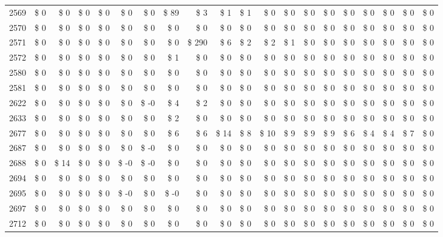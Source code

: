 \begin{longtable}{lrrrrrrrrrrrrrrrrrrr}
2569 & \$ 0 & \$ 0 & \$ 0 & \$ 0 & \$ 0 & \$ 0 & \$ 89 & \$ 3 & \$ 1 & \$ 1 & \$ 0 & \$ 0 & \$ 0 & \$ 0 & \$ 0 & \$ 0 & \$ 0 & \$ 0 & \$ 0 \\
2570 & \$ 0 & \$ 0 & \$ 0 & \$ 0 & \$ 0 & \$ 0 & \$ 0 & \$ 0 & \$ 0 & \$ 0 & \$ 0 & \$ 0 & \$ 0 & \$ 0 & \$ 0 & \$ 0 & \$ 0 & \$ 0 & \$ 0 \\
2571 & \$ 0 & \$ 0 & \$ 0 & \$ 0 & \$ 0 & \$ 0 & \$ 0 & \$ 290 & \$ 6 & \$ 2 & \$ 2 & \$ 1 & \$ 0 & \$ 0 & \$ 0 & \$ 0 & \$ 0 & \$ 0 & \$ 0 \\
2572 & \$ 0 & \$ 0 & \$ 0 & \$ 0 & \$ 0 & \$ 0 & \$ 1 & \$ 0 & \$ 0 & \$ 0 & \$ 0 & \$ 0 & \$ 0 & \$ 0 & \$ 0 & \$ 0 & \$ 0 & \$ 0 & \$ 0 \\
2580 & \$ 0 & \$ 0 & \$ 0 & \$ 0 & \$ 0 & \$ 0 & \$ 0 & \$ 0 & \$ 0 & \$ 0 & \$ 0 & \$ 0 & \$ 0 & \$ 0 & \$ 0 & \$ 0 & \$ 0 & \$ 0 & \$ 0 \\
2581 & \$ 0 & \$ 0 & \$ 0 & \$ 0 & \$ 0 & \$ 0 & \$ 0 & \$ 0 & \$ 0 & \$ 0 & \$ 0 & \$ 0 & \$ 0 & \$ 0 & \$ 0 & \$ 0 & \$ 0 & \$ 0 & \$ 0 \\
2622 & \$ 0 & \$ 0 & \$ 0 & \$ 0 & \$ 0 & \$ -0 & \$ 4 & \$ 2 & \$ 0 & \$ 0 & \$ 0 & \$ 0 & \$ 0 & \$ 0 & \$ 0 & \$ 0 & \$ 0 & \$ 0 & \$ 0 \\
2633 & \$ 0 & \$ 0 & \$ 0 & \$ 0 & \$ 0 & \$ 0 & \$ 2 & \$ 0 & \$ 0 & \$ 0 & \$ 0 & \$ 0 & \$ 0 & \$ 0 & \$ 0 & \$ 0 & \$ 0 & \$ 0 & \$ 0 \\
2677 & \$ 0 & \$ 0 & \$ 0 & \$ 0 & \$ 0 & \$ 0 & \$ 6 & \$ 6 & \$ 14 & \$ 8 & \$ 10 & \$ 9 & \$ 9 & \$ 9 & \$ 6 & \$ 4 & \$ 4 & \$ 7 & \$ 0 \\
2687 & \$ 0 & \$ 0 & \$ 0 & \$ 0 & \$ 0 & \$ -0 & \$ 0 & \$ 0 & \$ 0 & \$ 0 & \$ 0 & \$ 0 & \$ 0 & \$ 0 & \$ 0 & \$ 0 & \$ 0 & \$ 0 & \$ 0 \\
2688 & \$ 0 & \$ 14 & \$ 0 & \$ 0 & \$ -0 & \$ -0 & \$ 0 & \$ 0 & \$ 0 & \$ 0 & \$ 0 & \$ 0 & \$ 0 & \$ 0 & \$ 0 & \$ 0 & \$ 0 & \$ 0 & \$ 0 \\
2694 & \$ 0 & \$ 0 & \$ 0 & \$ 0 & \$ 0 & \$ 0 & \$ 0 & \$ 0 & \$ 0 & \$ 0 & \$ 0 & \$ 0 & \$ 0 & \$ 0 & \$ 0 & \$ 0 & \$ 0 & \$ 0 & \$ 0 \\
2695 & \$ 0 & \$ 0 & \$ 0 & \$ 0 & \$ -0 & \$ 0 & \$ -0 & \$ 0 & \$ 0 & \$ 0 & \$ 0 & \$ 0 & \$ 0 & \$ 0 & \$ 0 & \$ 0 & \$ 0 & \$ 0 & \$ 0 \\
2697 & \$ 0 & \$ 0 & \$ 0 & \$ 0 & \$ 0 & \$ 0 & \$ 0 & \$ 0 & \$ 0 & \$ 0 & \$ 0 & \$ 0 & \$ 0 & \$ 0 & \$ 0 & \$ 0 & \$ 0 & \$ 0 & \$ 0 \\
2712 & \$ 0 & \$ 0 & \$ 0 & \$ 0 & \$ 0 & \$ 0 & \$ 0 & \$ 0 & \$ 0 & \$ 0 & \$ 0 & \$ 0 & \$ 0 & \$ 0 & \$ 0 & \$ 0 & \$ 0 & \$ 0 & \$ 0 \\

\end{longtable}
